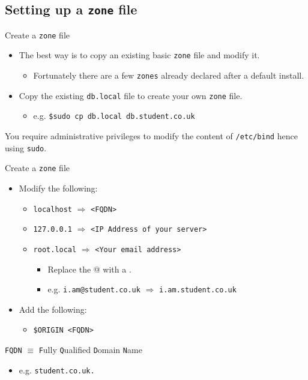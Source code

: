 \documentclass[aspectratio=169,xcolor=table]{beamer}
\begin{document}
\subsection{Setting up a \texttt{zone} file}
\begin{frame}{Create a \texttt{zone} file}
  \begin{itemize}
    \item The best way is to copy an existing basic \texttt{zone} file and modify it.
      \begin{itemize}
        \item Fortunately there are a few \texttt{zones} already declared after a default install.
      \end{itemize}
  \item Copy the existing \texttt{db.local} file to create your own \texttt{zone} file.
    \begin{itemize}
      \item e.g. \texttt{\$sudo cp db.local db.student.co.uk}
    \end{itemize}
  \end{itemize}
  \begin{tcolorbox}[title={\textbf{NOTE:}}]
    You require administrative privileges to modify the content of \texttt{/etc/bind} hence using \texttt{sudo}.
  \end{tcolorbox}
\end{frame}

\begin{frame}{Create a \texttt{zone} file}
  \begin{itemize}
    \item Modify the following:
      \begin{itemize}
        \item \texttt{localhost} $\Longrightarrow$ \texttt{<FQDN>}
        \item \texttt{127.0.0.1} $\Longrightarrow$ \texttt{<IP Address of your server>}
        \item \texttt{root.local} $\Longrightarrow$ \texttt{<Your email address>}
          \begin{itemize}
            \item Replace the @ with a . 
            \item e.g. \texttt{i.am@student.co.uk} $\Longrightarrow$ \texttt{i.am.student.co.uk}
          \end{itemize}
      \end{itemize}
      \item Add the following:
        \begin{itemize}
          \item \texttt{\$ORIGIN <FQDN>}
        \end{itemize}
  \end{itemize}
  \begin{tcolorbox}[title={\textbf{NOTE:}}]
    \texttt{FQDN} $\equiv$ \texttt{F}ully \texttt{Q}ualified \texttt{D}omain \texttt{N}ame
    \begin{itemize}
      \item e.g. \texttt{student.co.uk.}
    \end{itemize}
  \end{tcolorbox}
\end{frame}
\end{document}

